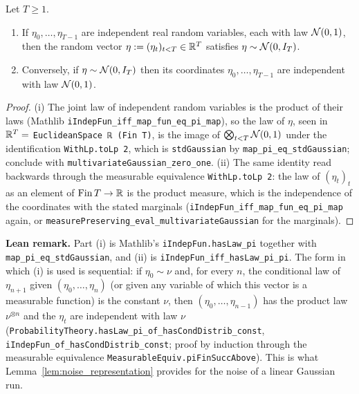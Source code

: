 \begin{lemma}\label{lem:gauss_pi}
\leanok
{}
Let $T \ge 1$.
\begin{enumerate}
  \item[(i)] If $\eta_0, \dots, \eta_{T-1}$ are independent real random variables, each with
        law $\mathcal{N}(0,1)$, then the random vector $\eta := (\eta_t)_{t<T} \in \mathbb{R}^T$
        satisfies $\eta \sim \mathcal{N}(0, I_T)$.
  \item[(ii)] Conversely, if $\eta \sim \mathcal{N}(0, I_T)$ then its coordinates
        $\eta_0,\dots,\eta_{T-1}$ are independent with law $\mathcal{N}(0,1)$.
\end{enumerate}
\end{lemma}

\begin{proof}
(i) The joint law of independent random variables is the product of their laws
(Mathlib \texttt{iIndepFun\_iff\_map\_fun\_eq\_pi\_map}), so the law of $\eta$, seen in
$\mathbb{R}^T = $ \texttt{EuclideanSpace ℝ (Fin T)}, is the image of
$\bigotimes_{t<T}\mathcal{N}(0,1)$ under the identification \texttt{WithLp.toLp 2}, which is
\texttt{stdGaussian} by \texttt{map\_pi\_eq\_stdGaussian}; conclude with
\texttt{multivariateGaussian\_zero\_one}. (ii) The same identity read backwards through the
measurable equivalence \texttt{WithLp.toLp 2}: the law of $(\eta_t)_t$ as an element of
$\mathrm{Fin}\,T \to \mathbb{R}$ is the product measure, which is the independence of the
coordinates with the stated marginals (\texttt{iIndepFun\_iff\_map\_fun\_eq\_pi\_map} again,
or \texttt{measurePreserving\_eval\_multivariateGaussian} for the marginals).
\end{proof}

\textbf{Lean remark.} Part (i) is Mathlib's \texttt{iIndepFun.hasLaw\_pi} together with
\texttt{map\_pi\_eq\_stdGaussian}, and (ii) is \texttt{iIndepFun\_iff\_hasLaw\_pi\_pi}. The form
in which (i) is used is sequential: if $\eta_0 \sim \nu$ and, for every $n$, the conditional law
of $\eta_{n+1}$ given $(\eta_0,\dots,\eta_n)$ (or given any variable of which this vector is a
measurable function) is the constant $\nu$, then $(\eta_0,\dots,\eta_{n-1})$ has the product law
$\nu^{\otimes n}$ and the $\eta_t$ are independent with law $\nu$
(\texttt{ProbabilityTheory.hasLaw\_pi\_of\_hasCondDistrib\_const},
\texttt{iIndepFun\_of\_hasCondDistrib\_const}; proof by induction through the measurable
equivalence \texttt{MeasurableEquiv.piFinSuccAbove}). This is what
Lemma~\ref{lem:noise_representation} provides for the noise of a linear Gaussian run.

